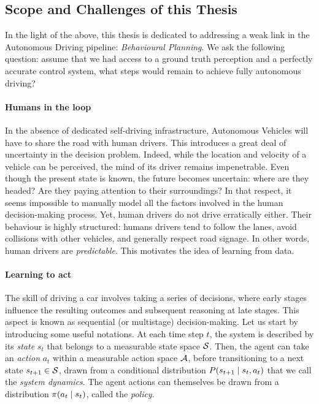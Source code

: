 \subsection{Scope and Challenges of this Thesis}

In the light of the above, this thesis is dedicated to addressing a weak link in the Autonomous Driving pipeline: \emph{Behavioural Planning}.  We ask the following question: assume that we had access to a ground truth perception and a perfectly accurate control system, what steps would remain to achieve fully autonomous driving?


\paragraph{Humans in the loop}

In the absence of dedicated self-driving infrastructure, Autonomous Vehicles will have to share the road with human drivers. This introduces a great deal of uncertainty in the decision problem. Indeed, while the location and velocity of a vehicle can be perceived, the mind of its driver remains impenetrable. Even though the present state is known, the future becomes uncertain: where are they headed? Are they paying attention to their surroundings? In that respect, it seems impossible to manually model all the factors involved in the human decision-making process. Yet, human drivers do not drive erratically either. Their behaviour is highly structured: humans drivers tend to follow the lanes, avoid collisions with other vehicles, and generally respect road signage. In other words, human drivers are \emph{predictable}. This motivates the idea of learning from data.%

\paragraph{Learning to act}

The skill of driving a car involves taking a series of decisions, where early stages influence the resulting outcomes and subsequent reasoning at late stages. This aspect is known as sequential (or multistage) decision-making. Let us start by introducing some useful notations. At each time step $t$, the system is described by its \emph{state} $s_t$ that belongs to a measurable state space $\mathcal{S}$. Then, the agent can take an \emph{action} $a_t$ within a measurable action space $\mathcal{A}$, before transitioning to a next state $s_{t+1}\in\mathcal{S}$, drawn from a conditional distribution $P\lparen s_{t+1} \mid s_t, a_t\rparen$ that we call the \emph{system dynamics}. The agent actions can themselves be drawn from a distribution $\pi\lparen a_t\mid s_t\rparen$, called the \emph{policy}.

